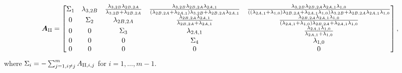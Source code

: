 \begin{align*}
  \bm{A}_{\RN{2}}=\begin{bmatrix}
\Sigma_1 %
 & \lambda_{3,2B} & \frac{\lambda_{3,2B} \lambda_{2B,2A}}{\lambda_{3,2B}+\lambda_{2B,2A}} & \frac{\lambda_{3,2B} \lambda_{2B,2A} \lambda_{2A,1}}{\left(\lambda_{2B,2A}+\lambda_{2A,1}\right) \lambda_{3,2B}+\lambda_{2B,2A} \lambda_{2A,1}} & \frac{\lambda_{3,2B} \lambda_{2B,2A} \lambda_{2A,1} \lambda_{1,0}}{\left(\left(\lambda_{2A,1}+\lambda_{1,0}\right) \lambda_{2B,2A}+\lambda_{2A,1} \lambda_{1,0}\right) \lambda_{3,2B}+\lambda_{2B,2A} \lambda_{2A,1} \lambda_{1,0}} 
\\
 0 & 
 \Sigma_2 %
 & \lambda_{2B,2A} & \frac{\lambda_{2B,2A} \lambda_{2A,1}}{\lambda_{2B,2A}+\lambda_{2A,1}} & \frac{\lambda_{2B,2A} \lambda_{2A,1} \lambda_{1,0}}{\left(\lambda_{2A,1}+\lambda_{1,0}\right) \lambda_{2B,2A}+\lambda_{2A,1} \lambda_{1,0}} 
\\
 0 & 0 & %
 \Sigma_3 & \lambda_{2A,1} & \frac{\lambda_{2A,1} \lambda_{1,0}}{\lambda_{2A,1}+\lambda_{1,0}} 
\\
 0 & 0 & 0 & %
 \Sigma_4 & \lambda_{1,0} 
\\
 0 & 0 & 0 & 0 & 0 
    \end{bmatrix},
\end{align*}
where $\Sigma_i = -\sum_{j=1, i \neq j}^m A_{\RN{2},i,j}$ for $i = 1, \dots, m-1$. 

